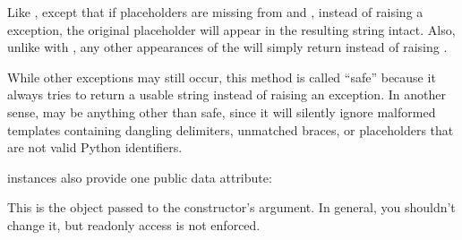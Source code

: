 \documentclass[letterpaper,10pt,english]{sphinxmanual}
\begin{document}
\begin{fulllineitems}
\vspace{5px}

\begin{fulllineitems}
\label{\detokenize{string:string.Template.safe_substitute}}
Like {\hyperref[\detokenize{string:string.Template.substitute}]{}}, except that if placeholders are missing from
 and , instead of raising a  exception, the
original placeholder will appear in the resulting string intact.  Also,
unlike with {\hyperref[\detokenize{string:string.Template.substitute}]{}}, any other appearances of the \sphinxcode{\sphinxupquote{\$}} will
simply return \sphinxcode{\sphinxupquote{\$}} instead of raising .

While other exceptions may still occur, this method is called “safe”
because it always tries to return a usable string instead of
raising an exception.  In another sense, {\hyperref[\detokenize{string:string.Template.safe_substitute}]{}} may be
anything other than safe, since it will silently ignore malformed
templates containing dangling delimiters, unmatched braces, or
placeholders that are not valid Python identifiers.

\end{fulllineitems}


{\hyperref[\detokenize{string:string.Template}]{}} instances also provide one public data attribute:

\vspace{5px}

\begin{fulllineitems}
\label{\detokenize{string:string.Template.template}}
This is the object passed to the constructor’s  argument.  In
general, you shouldn’t change it, but read\sphinxhyphen{}only access is not enforced.

\end{fulllineitems}


\end{fulllineitems}
\end{document}
